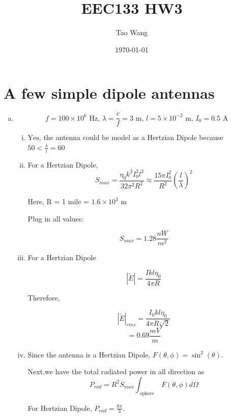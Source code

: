 \documentclass{article} %
\begin{document}
\title{EEC133 HW3}
\author{Tao Wang}
\date{\today}

\maketitle
\tableofcontents

\section{A few simple dipole antennas}
\begin{enumerate}[(a)]
      \item
            \[f = 100 \times 10^6 \text{ Hz, } \lambda = \frac{c}{f} = 3 \text{ m, } l = 5 \times 10^{-2} \text{ m, } I_0 = 0.5 \text{ A }\]
            \begin{enumerate}[(i)]
                  \item $\boxed{\text{Yes}}$, the antenna could be model as a Hertzian Dipole because $50 < \frac{\lambda}{l} = 60$
                  \item For a Hertzian Dipole,
                        \[S_{max} = \frac{\eta_0 k^2 I_0 ^2 l^2}{32 \pi^2 R^2} \approx \frac{15 \pi I_0 ^2}{R^2}\left(\frac{l}{\lambda}\right)^2\]

                        Here, R = 1 mile = $1.6 \times 10^3 \text{ m}$

                        Plug in all values:

                        \[\boxed{S_{max} = 1.28 \si{\frac{nW}{m^2}}}\]
                  \item
                        For a Hertzian Dipole

                        \[|\widetilde{E}| = \frac{I k l \eta_0}{4 \pi R}\]

                        Therefore,

                        \[|\widetilde{E}|_{rms} = \frac{I_0 k l \eta_0}{4 \pi R \sqrt{2}}\]
                        \[= \boxed{0.69 \si{\frac{mV}{m}}}\]
                  \item
                        Since the antenna is a Hertzian Dipole, $F(\theta, \phi) = \sin^2(\theta)$.

                        Next,we have the total radiated power in all direction as
                        \[P_{rad} = R^2 S_{max}\int_{\text{ sphere }}  F(\theta, \phi) d\Omega\]

                        For Hertzian Dipole, $P_{rad} = \frac{8 \pi}{3}$.


\end{enumerate}
\end{enumerate}
\end{document}
